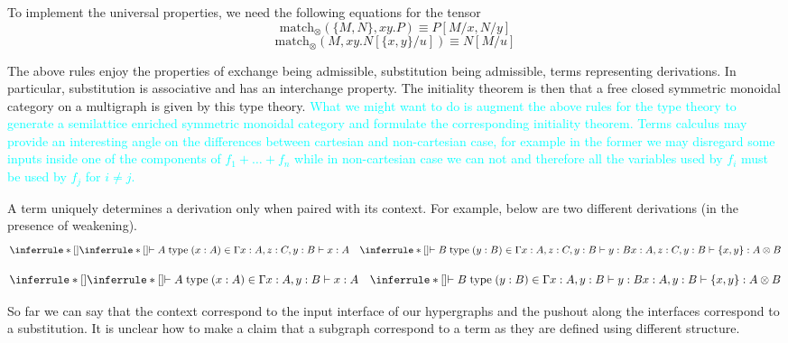 \documentclass[acmsmall,screen, nonacm, anonymous]{acmart}
\begin{document}
To implement the universal properties, we need the following equations for the tensor
\[
\text{match}_{\otimes}(\{M,N\}, xy.P) \equiv P[M / x, N /y]
\]
\[
\text{match}_{\otimes}(M, xy.N[\{x,y\}/ u]) \equiv N[M / u]
\]

The above rules enjoy the properties of exchange being admissible, substitution being admissible, terms representing derivations.
In particular, substitution is associative and has an interchange property.
The initiality theorem is then that a free closed symmetric monoidal category on a multigraph is given by this type theory.
\textcolor{cyan}{What we might want to do is augment the above rules for the type theory to generate a semilattice enriched symmetric monoidal category and formulate the corresponding initiality theorem.
Terms calculus may provide an interesting angle on the differences between cartesian and non-cartesian case, for example in the former we may disregard some inputs inside one of the components of $f_1 + \ldots + f_n$ while in non-cartesian case we can not and therefore all the variables used by $f_i$ must be used by $f_j$ for $i \not = j$.}

\begin{remark}
  A term uniquely determines a derivation only when paired with its context.
  For example, below are two different derivations (in the presence of weakening).
  \[
  \inferrule*[]{
    \inferrule*[]{
      \vdash A\;\text{type}\;(x : A) \in \Gamma
      }
      {x : A, z : C, y : B \vdash x : A
      }
     \quad 
      \inferrule*[]{
        \vdash B\;\text{type}\;(y : B) \in \Gamma
        }
        {x : A, z : C, y : B \vdash y : B
        }
        }
      {x : A, z : C, y : B \vdash \{x,y\} : A \otimes B}
  \]

  \[
  \inferrule*[]{
    \inferrule*[]{
      \vdash A\;\text{type}\;(x : A) \in \Gamma
      }
      {x : A, y : B \vdash x : A
      }
     \quad 
      \inferrule*[]{
        \vdash B\;\text{type}\;(y : B) \in \Gamma
        }
        {x : A, y : B \vdash y : B
        }
        }
        {x : A, y : B \vdash \{x,y\} : A \otimes B}
  \]
\end{remark}

So far we can say that the context correspond to the input interface of our hypergraphs and the pushout along the interfaces correspond to a substitution.
It is unclear how to make a claim that a subgraph correspond to a term as they are defined using different structure.


\end{document}
